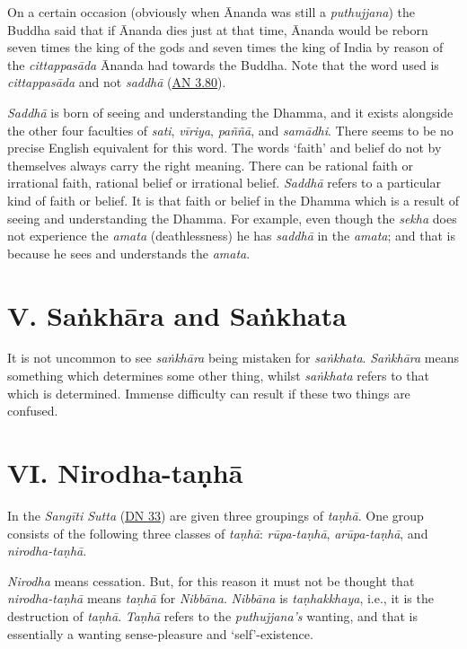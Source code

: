 On a certain occasion (obviously when Ānanda was still a \emph{puthujjana}) the Buddha said that if Ānanda dies just at that time, Ānanda would be reborn seven times the king of the gods and seven times the king of India by reason of the \emph{cittappasāda} Ānanda had towards the Buddha. Note that the word used is \emph{cittappasāda} and not \emph{saddhā} (\href{https://suttacentral.net/an3.80/en/sujato}{AN 3.80}).

\emph{Saddhā} is born of seeing and understanding the Dhamma, and it exists alongside the other four faculties of \emph{sati}, \emph{vīriya}, \emph{paññā}, and \emph{samādhi}. There seems to be no precise English equivalent for this word. The words `faith' and belief do not by themselves always carry the right meaning. There can be rational faith or irrational faith, rational belief or irrational belief. \emph{Saddhā} refers to a particular kind of faith or belief. It is that faith or belief in the Dhamma which is a result of seeing and understanding the Dhamma. For example, even though the \emph{sekha} does not experience the \emph{amata} (deathlessness) he has \emph{saddhā} in the \emph{amata}; and that is because he sees and understands the \emph{amata}.

\section{V. Saṅkhāra and Saṅkhata}

It is not uncommon to see \emph{saṅkhāra} being mistaken for \emph{saṅkhata}. \emph{Saṅkhāra} means something which determines some other thing, whilst \emph{saṅkhata} refers to that which is determined. Immense difficulty can result if these two things are confused.

\section{VI. Nirodha-taṇhā}

In the \emph{Sangīti Sutta} (\href{https://suttacentral.net/dn33/en/sujato}{DN 33}) are given three groupings of \emph{taṇhā}. One group consists of the following three classes of \emph{taṇhā}: \emph{rūpa-taṇhā}, \emph{arūpa-taṇhā}, and \emph{nirodha-taṇhā}.

\emph{Nirodha} means cessation. But, for this reason it must not be thought that \emph{nirodha-taṇhā} means \emph{taṇhā} for \emph{Nibbāna}. \emph{Nibbāna} is \emph{taṇhakkhaya}, i.e., it is the destruction of \emph{taṇhā}. \emph{Taṇhā} refers to the \emph{puthujjana's} wanting, and that is essentially a wanting sense-pleasure and `self'-existence.

